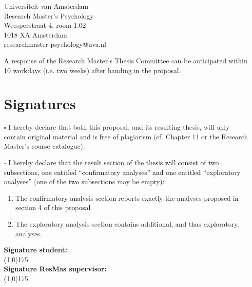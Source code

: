 \documentclass[12pt,a4paper]{article}\usepackage[]{graphicx}\usepackage[]{color}
\begin{document}
\noindent
Universiteit van Amsterdam \\
Research Master’s Psychology \\
Weesperstraat 4, room 1.02 \\
1018 XA Amsterdam \\
researchmaster-psychology@uva.nl
\vspace{\baselineskip}

\noindent
A response of the Research Master's Thesis Committee can be anticipated within 10 workdays (i.e. two weeks) after handing in the proposal. 

\section{Signatures}
$\square$ I hereby declare that both this proposal, and its resulting thesis, will only contain original material and is free of plagiarism (cf. Chapter 11 or the Research Master's course catalogue).
\vspace{\baselineskip}

\noindent
$\square$ I hereby declare that the result section of the thesis will consist of two subsections, one entitled ``confirmatory analyses'' and one entitled ``exploratory analyses'' (one of the two subsections may be empty):

\begin{enumerate}
\item The confirmatory analysis section reports exactly the analyses proposed in section 4 of this proposal
\item The exploratory analysis section contains additional, and thus exploratory, analyses. 
\end{enumerate}

\noindent
\textbf{Signature student:} 
\vspace*{2\baselineskip} \\
\line(1,0){175} \\

\noindent
\textbf{Signature ResMas supervisor:}
\vspace*{2\baselineskip} \\
\line(1,0){175} \\

%
\end{document}
